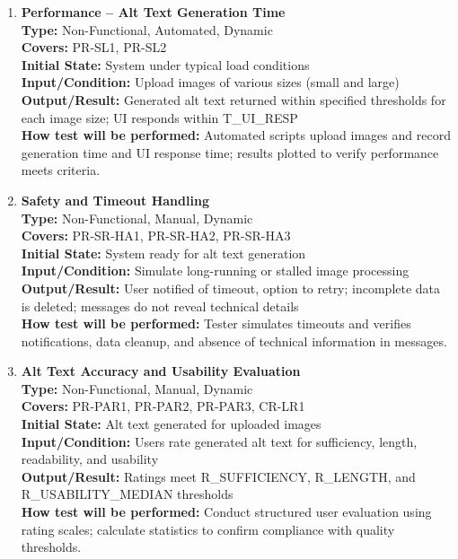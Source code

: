 \documentclass[12pt, titlepage]{article}
\begin{document}
\begin{enumerate}[label=NFR-ST \arabic*., wide=0pt, leftmargin=*]
  \item \textbf{Performance – Alt Text Generation Time} \\[2mm]
    \textbf{Type:} Non-Functional, Automated, Dynamic \\
    \textbf{Covers:} PR-SL1, PR-SL2 \\
    \textbf{Initial State:} System under typical load conditions \\
    \textbf{Input/Condition:} Upload images of various sizes (small
    and large) \\
    \textbf{Output/Result:} Generated alt text returned within
    specified thresholds for each image size; UI responds within
    T\_UI\_RESP \\[2mm]
    \textbf{How test will be performed:} Automated scripts upload
    images and record generation time and UI response time; results
    plotted to verify performance meets criteria.

  \item \textbf{Safety and Timeout Handling} \\[2mm]
    \textbf{Type:} Non-Functional, Manual, Dynamic \\
    \textbf{Covers:} PR-SR-HA1, PR-SR-HA2, PR-SR-HA3 \\
    \textbf{Initial State:} System ready for alt text generation \\
    \textbf{Input/Condition:} Simulate long-running or stalled image
    processing \\
    \textbf{Output/Result:} User notified of timeout, option to
    retry; incomplete data is deleted; messages do not reveal
    technical details \\ [2mm]
    \textbf{How test will be performed:} Tester simulates timeouts
    and verifies notifications, data cleanup, and absence of
    technical information in messages.

  \item \textbf{Alt Text Accuracy and Usability Evaluation} \\[2mm]
    \textbf{Type:} Non-Functional, Manual, Dynamic \\
    \textbf{Covers:} PR-PAR1, PR-PAR2, PR-PAR3, CR-LR1 \\
    \textbf{Initial State:} Alt text generated for uploaded images \\
    \textbf{Input/Condition:} Users rate generated alt text for
    sufficiency, length, readability, and usability \\
    \textbf{Output/Result:} Ratings meet R\_SUFFICIENCY, R\_LENGTH, and
    R\_USABILITY\_MEDIAN thresholds \\[2mm]
    \textbf{How test will be performed:} Conduct structured user
    evaluation using rating scales; calculate statistics to confirm
    compliance with quality thresholds.


\end{enumerate}
\end{document}
